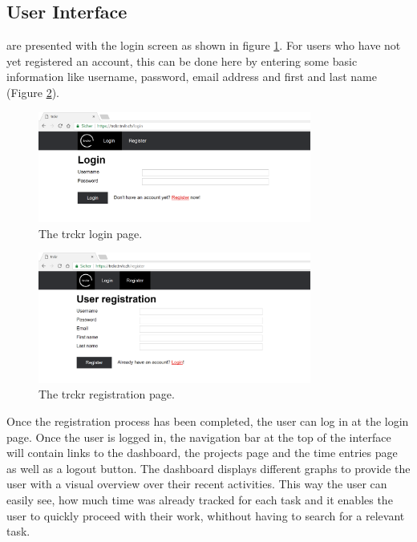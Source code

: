 \documentclass[bibliography=totoc, listof=totocnumbered]{scrartcl}
\begin{document}
\subsection{User Interface}

 are presented with the login
screen as shown in figure \ref{fig:trckr-login}. For users who have not yet
registered an account, this can be done here by entering some basic information
like username, password, email address and first and last name (Figure
\ref{fig:trckr-register}).

\begin{figure}[h]
    \includegraphics[width=0.8\textwidth]{trckr-login}
    \caption{The trckr login page.}
    \label{fig:trckr-login}
\end{figure}

\begin{figure}[h]
    \includegraphics[width=0.8\textwidth]{trckr-register}
    \caption{The trckr registration page.}
    \label{fig:trckr-register}
\end{figure}

Once the registration process has been completed, the
user can log in at the login page. Once the user is logged in, the navigation
bar at the top of the interface will contain links to the dashboard, the
projects page and the time entries page as well as a logout button. The dashboard
displays different graphs to provide the user with a visual overview over their recent activities.
This way the user can easily see, how much time was already tracked for each task and it enables
the user to quickly proceed with their work, whithout having to search for a relevant task.
\end{document}
